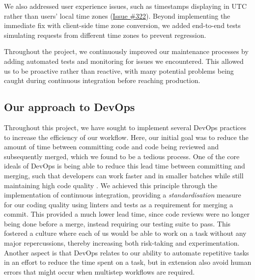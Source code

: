 We also addressed user experience issues, such as timestamps displaying in UTC rather than users' local time zones (\href{https://github.com/devops-q/devops/issues/322}{Issue \#322}). Beyond implementing the immediate fix with client-side time zone conversion, we added end-to-end tests simulating requests from different time zones to prevent regression.

Throughout the project, we continuously improved our maintenance processes by adding automated tests and monitoring for issues we encountered. This allowed us to be proactive rather than reactive, with many potential problems being caught during continuous integration before reaching production.

\subsection{Our approach to DevOps} %
Throughout this project, we have sought to implement several DevOps practices to increase the efficiency of our workflow. Here, our initial goal was to reduce the amount of time between committing code and code being reviewed and subsequently merged, which we found to be a tedious process. One of the core ideals of DevOps is being able to reduce this lead time between committing and merging, such that developers can work faster and in smaller batches while still maintaining high code quality \parencite{handbook}. We achieved this principle through the implementation of continuous integration, providing a \textit{standardisation} measure for our coding quality using linters and tests as a requirement for merging a commit. This provided a much lower lead time, since code reviews were no longer being done before a merge, instead requiring our testing suite to pass. This fostered a culture where each of us would be able to work on a task without any major repercussions, thereby increasing both risk-taking and experimentation. Another aspect is that DevOps relates to our ability to automate repetitive tasks in an effort to reduce the time spent on a task, but in extension also avoid human errors that might occur when multistep workflows are required.  